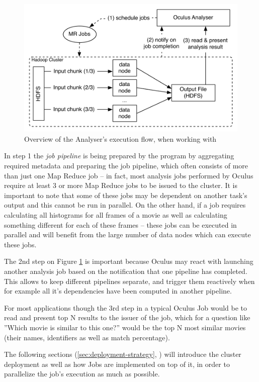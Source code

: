 \begin{figure}[ch!]
  \centering
  \includegraphics[scale=0.9]{img/analyser-high-level}
  \caption{Overview of the Analyser's execution flow, when working with}
  \label{fig:analyser-high-level}
\end{figure}

In step 1 the \textit{job pipeline} is being prepared by the program by aggregating required metadata and preparing the job pipeline, which often consists of more than just one Map Reduce job -- in fact, most analysis jobs performed by Oculus require at least 3 or more Map Reduce jobs to be issued to the cluster. It is important to note that some of these jobs may be dependent on another task's output and this cannot be run in parallel. On the other hand, if a job requires calculating all histograms for all frames of a movie as well as calculating something different for each of these frames -- these jobs can be executed in parallel and will benefit from the large number of data nodes which can execute these jobs.

The 2nd step on Figure \ref{fig:analyser-high-level} is important because Oculus may react with launching another analysis job based on the notification that one pipeline has completed. This allows to keep different pipelines separate, and trigger them reactively when for example all it's dependencies have been computed in another pipeline.

For most applications though the 3rd step in a typical Oculus Job would be to read and present top N results to the issuer of the job, which for a question like ''Which movie is similar to this one?'' would be the top N most similar movies (their names, identifiers as well as match percentage).

The following sections (\ref{sec:deployment-strategy}, \label{sec:defining-pipelines-basics}) will introduce the cluster deployment as well as how Jobs are implemented on top of it, in order to parallelize the job's execution as much as possible.



